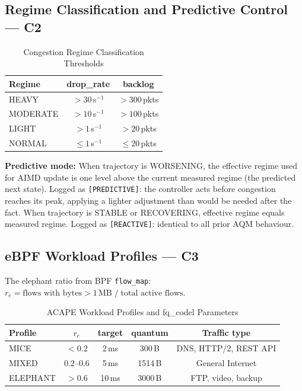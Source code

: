 \documentclass[conference]{IEEEtran}
\begin{document}
\subsection{Regime Classification and Predictive Control --- C2}

\begin{table}[h]
\centering
\caption{Congestion Regime Classification Thresholds}
\label{tab:regimes}
\scriptsize
\begin{tabular}{lcc}
\toprule
\textbf{Regime} & \textbf{drop\_rate} & \textbf{backlog} \\
\midrule
HEAVY    & $>30$\,s$^{-1}$ & $>300$\,pkts \\
MODERATE & $>10$\,s$^{-1}$ & $>100$\,pkts \\
LIGHT    & $>1$\,s$^{-1}$  & $>20$\,pkts  \\
NORMAL   & $\leq1$\,s$^{-1}$& $\leq20$\,pkts \\
\bottomrule
\end{tabular}
\end{table}

\textbf{Predictive mode:} When trajectory is WORSENING, the effective regime
used for AIMD update is one level above the current measured regime (the
predicted next state). Logged as \texttt{[PREDICTIVE]}: the controller acts
before congestion reaches its peak, applying a lighter adjustment than would
be needed after the fact. When trajectory is STABLE or RECOVERING, effective
regime equals measured regime. Logged as \texttt{[REACTIVE]}: identical to
all prior AQM behaviour.

\subsection{eBPF Workload Profiles --- C3}

The elephant ratio from BPF \texttt{flow\_map}:
$r_e = \text{flows with bytes} > 1\,\text{MB} \;/\; \text{total active flows}$.

\begin{table}[h]
\centering
\caption{ACAPE Workload Profiles and fq\_codel Parameters}
\label{tab:profiles}
\scriptsize
\begin{tabular}{lcccc}
\toprule
\textbf{Profile} & $r_e$ & \textbf{target} & \textbf{quantum} & \textbf{Traffic type} \\
\midrule
MICE     & $<0.2$      & 2\,ms  & 300\,B   & DNS, HTTP/2, REST API \\
MIXED    & $0.2$--$0.6$& 5\,ms  & 1514\,B  & General Internet \\
ELEPHANT & $>0.6$      & 10\,ms & 3000\,B  & FTP, video, backup \\
\bottomrule
\end{tabular}
\end{table}
\end{document}
